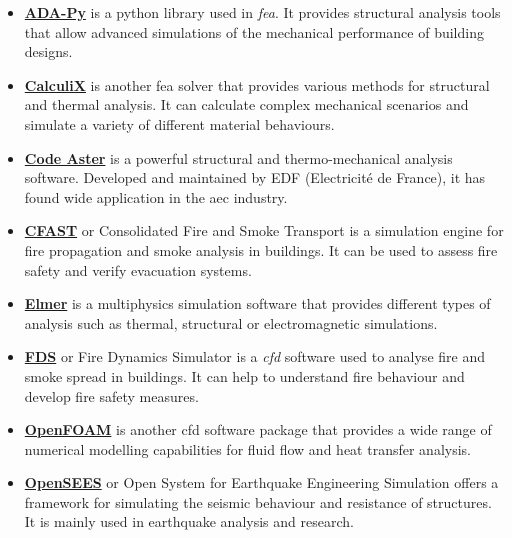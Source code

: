 \documentclass[a4paper, 12pt]{report}
\begin{document}
\begin{itemize}

\item \href{https://github.com/Krande/adapy}{\textbf{ADA-Py}} is a \Gls{python} library used in \textit{\acrfull{fea}}. It provides structural analysis tools that allow advanced simulations of the mechanical performance of building designs.

\item \href{http://www.calculix.de/}{\textbf{CalculiX}} is another \acrshort{fea} solver that provides various methods for structural and thermal analysis. It can calculate complex mechanical scenarios and simulate a variety of different material behaviours.

\item \href{https://code-aster.org/V2/spip.php?rubrique2}{\textbf{Code Aster}} is a powerful structural and thermo-mechanical analysis software. Developed and maintained by EDF (Electricité de France), it has found wide application in the \acrshort{aec} industry.

\item \href{https://github.com/firemodels/cfast}{\textbf{CFAST}} or Consolidated Fire and Smoke Transport is a simulation engine for fire propagation and smoke analysis in buildings. It can be used to assess fire safety and verify evacuation systems.

\item \href{https://github.com/ElmerCSC/elmerfem}{\textbf{Elmer}} is a multiphysics simulation software that provides different types of analysis such as thermal, structural or electromagnetic simulations.

\item \href{https://github.com/firemodels/fds}{\textbf{FDS}} or Fire Dynamics Simulator is a \textit{\acrlong{cfd}} software used to analyse fire and smoke spread in buildings. It can help to understand fire behaviour and develop fire safety measures.

\item \href{https://github.com/OpenFOAM/OpenFOAM-dev}{\textbf{OpenFOAM}} is another \acrshort{cfd} software package that provides a wide range of numerical modelling capabilities for fluid flow and heat transfer analysis.

\item \href{https://github.com/OpenSees/OpenSees}{\textbf{OpenSEES}} or Open System for Earthquake Engineering Simulation offers a framework for simulating the seismic behaviour and resistance of structures. It is mainly used in earthquake analysis and research.

\end{itemize}
\end{document}
